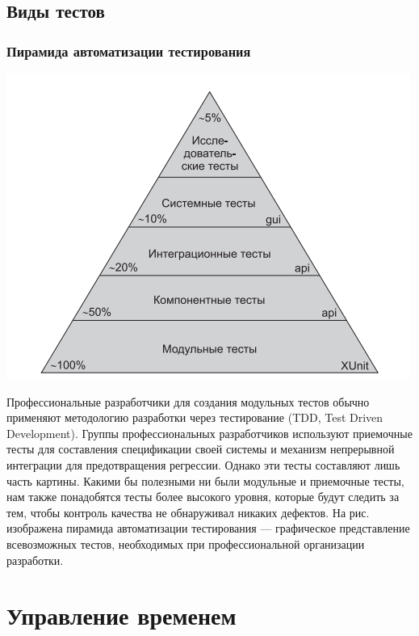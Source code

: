 \documentclass{../industrial-development}
\begin{document}
\subsection{Виды тестов}
\begin{frame} \frametitle{Пирамида автоматизации тестирования}
{\includegraphics[width=0.9\linewidth]{tests.png}}
\end{frame}
\lecturenotes
Профессиональные разработчики для создания модульных тестов обычно применяют методологию разработки через тестирование (TDD, Test Driven Development). Группы профессиональных разработчиков используют приемочные тесты для составления спецификации своей системы и механизм непрерывной интеграции для предотвращения регрессии. Однако эти тесты составляют лишь часть картины. Какими бы полезными ни были модульные и приемочные тесты, нам также понадобятся тесты более высокого уровня, которые будут следить за тем, чтобы контроль качества не обнаруживал никаких
дефектов. На рис. изображена пирамида автоматизации тестирования — графическое представление всевозможных тестов, необходимых при профессиональной организации разработки.


\section{Управление временем}
\end{document}
